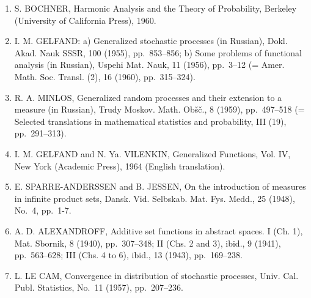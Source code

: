 \begin{enumerate}
  Ju. V. PROKHOROV, Convergence of random processes and limit theorems in probability theory, Theor. Probability Appl., 1 (1956), pp.~156--214.
\item
  S. BOCHNER, Harmonic Analysis and the Theory of Probability, Berkeley (University of California Press), 1960.
\item
  I. M. GELFAND: a) Generalized stochastic processes (in Russian), Dokl. Akad. Nauk SSSR, 100 (1955), pp.~853--856; b) Some problems of functional analysis (in Russian), Uspehi Mat. Nauk, 11 (1956), pp.~3--12 (= Amer. Math. Soc. Transl. (2), 16 (1960), pp.~315--324).
\item
  R. A. MINLOS, Generalized random processes and their extension to a measure (in Russian), Trudy Moskov. Math. Obšč., 8 (1959), pp.~497--518 (= Selected translations in mathematical statistics and probability, III (19), pp.~291--313).
\item
  I. M. GELFAND and N. Ya. VILENKIN, Generalized Functions, Vol. IV, New York (Academic Press), 1964 (English translation).
\item
  E. SPARRE-ANDERSSEN and B. JESSEN, On the introduction of measures in infinite product sets, Dansk. Vid. Selbskab. Mat. Fys. Medd., 25 (1948), No.~4, pp.~1-7.
\item
  A. D. ALEXANDROFF, Additive set functions in abstract spaces. I (Ch. 1), Mat. Sbornik, 8 (1940), pp.~307--348; II (Chs. 2 and 3), ibid., 9 (1941), pp.~563--628; III (Chs. 4 to 6), ibid., 13 (1943), pp.~169--238.
\item
  L. LE CAM, Convergence in distribution of stochastic processes, Univ. Cal. Publ. Statistics, No.~11 (1957), pp.~207--236.
\end{enumerate}

